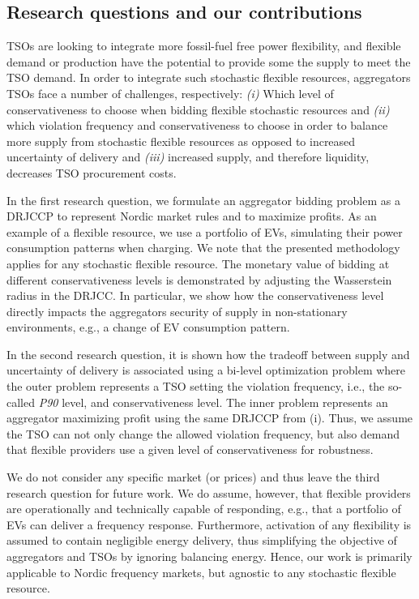 \documentclass[conference]{IEEEtran}
\begin{document}
\subsection{Research questions and our contributions}

\acp{TSO} are looking to integrate more fossil-fuel free power flexibility, and flexible demand or production have the potential to provide some the supply to meet the \ac{TSO} demand. In order to integrate such stochastic flexible resources, aggregators \acp{TSO} face a number of challenges, respectively: \textit{(i)} Which level of conservativeness to choose when bidding flexible stochastic resources and \textit{(ii)} which violation frequency and conservativeness to choose in order to balance more supply from stochastic flexible resources as opposed to increased uncertainty of delivery and \textit{(iii)} increased supply, and therefore liquidity, decreases \ac{TSO} procurement costs.

In the first research question, we formulate an aggregator bidding problem as a \ac{DRJCCP} to represent Nordic market rules and to maximize profits. As an example of a flexible resource, we use a portfolio of \acp{EV}, simulating their power consumption patterns when charging. We note that the presented methodology applies for any stochastic flexible resource. The monetary value of bidding at different conservativeness levels is demonstrated by adjusting the Wasserstein radius in the \ac{DRJCC}. In particular, we show how the conservativeness level directly impacts the aggregators security of supply in non-stationary environments, e.g., a change of \ac{EV} consumption pattern.

In the second research question, it is shown how the tradeoff between supply and uncertainty of delivery is associated using a bi-level optimization problem where the outer problem represents a \ac{TSO} setting the violation frequency, i.e., the so-called \textit{P90} level, and conservativeness level. The inner problem represents an aggregator maximizing profit using the same \ac{DRJCCP} from (i). Thus, we assume the \ac{TSO} can not only change the allowed violation frequency, but also demand that flexible providers use a given level of conservativeness for robustness.

We do not consider any specific market (or prices) and thus leave the third research question for future work. We do assume, however, that flexible providers are operationally and technically capable of responding, e.g., that a portfolio of \acp{EV} can deliver a frequency response. Furthermore, activation of any flexibility is assumed to contain negligible energy delivery, thus simplifying the objective of aggregators and \acp{TSO} by ignoring balancing energy. Hence, our work is primarily applicable to Nordic frequency markets, but agnostic to any stochastic flexible resource.
\end{document}
